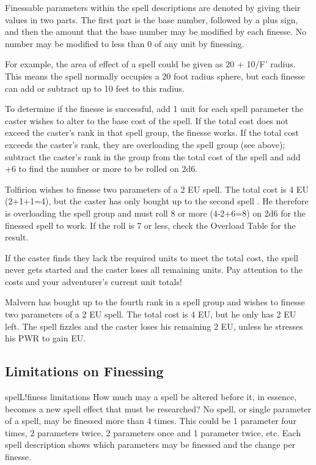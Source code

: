 Finessable parameters within the spell descriptions are denoted by giving their values in two parts. The first part is the base number, followed by a plus sign, and then the
amount that the base number may be modified by each finesse. No number may be modified to less than 0 of any unit by finessing.

For example, the area of effect of a spell could be given as 20 + 10/F' radius. This means the spell normally occupies a 20 foot radius sphere, but each finesse can add or subtract up to 10 feet to this radius. 

To determine if the finesse is successful, add 1 unit for each spell parameter the caster wishes to alter to the base cost of the spell. If the total cost does not exceed the caster's rank in that spell group, the finesse works. If the total cost exceeds the caster's rank, they are overloading the spell group (see above); subtract the caster's rank in the group from the total cost of the spell and add +6 to find the number or more to be rolled on 2d6.

Tolfirion wishes to finesse two parameters of a 2 EU spell. The total cost is 4 EU (2+1+1=4), but the caster has only bought up to the second spell . He therefore is overloading the spell group and must roll 8 or more (4-2+6=8) on 2d6 for the finessed spell to work. If the roll is 7 or less, check the Overload Table for the result.

If the caster finds they lack the required units to meet the total cost, the spell never gets started and the caster loses all remaining units. Pay attention to the costs and your adventurer's current unit totals!

Malvern has bought up to the fourth rank in a spell group and wishes to finesse two parameters of a 2 EU spell. The total cost is 4 EU, but he only has 2 EU left. The spell fizzles and the caster loses his remaining 2 EU, unless he stresses his PWR to gain EU.
\subsection{Limitations on Finessing}
spelL!finess limitations
How much may a spell be altered before it, in essence, becomes a new spell effect that must be researched? No spell, or single parameter of a spell, may be finessed more than 4 times. This could be 1 parameter four times, 2 parameters twice, 2 parameters once and 1 parameter twice, etc. Each spell description shows which parameters may be finessed and the change per finesse.

